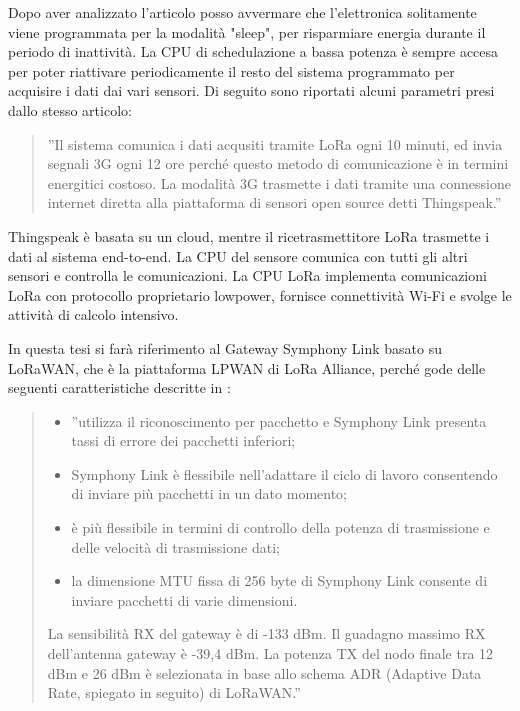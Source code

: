 \documentclass[a4paper]{report} %
\begin{document}
Dopo aver analizzato l'articolo \cite{art:rif.43} posso avvermare che l'elettronica solitamente viene programmata per la modalità "sleep", per risparmiare energia durante il periodo di inattività. La CPU di schedulazione a bassa potenza è sempre accesa per poter riattivare periodicamente il resto del sistema programmato per acquisire i dati dai vari sensori. Di seguito sono riportati alcuni parametri presi dallo stesso articolo:
\begin{quote}
	''Il sistema comunica i dati acqusiti tramite LoRa ogni 10 minuti, ed invia segnali 3G ogni 12 ore perché questo metodo di comunicazione è in termini energitici costoso. La modalità 3G trasmette i dati tramite una connessione internet diretta alla piattaforma di sensori open source detti Thingspeak.'' 
\end{quote}
Thingspeak è basata su un cloud, mentre il ricetrasmettitore LoRa trasmette i dati al sistema end-to-end. La CPU del sensore comunica con tutti gli altri sensori e controlla le comunicazioni. La CPU LoRa implementa comunicazioni LoRa con protocollo proprietario lowpower, fornisce connettività Wi-Fi e svolge le attività di calcolo intensivo. 

In questa tesi si farà riferimento al Gateway Symphony Link basato su LoRaWAN, che è la piattaforma LPWAN di LoRa Alliance, perché gode delle seguenti caratteristiche descritte in \cite{art:rif.47}:
\begin{quote}
	\begin{itemize}
		\item ''utilizza il riconoscimento per pacchetto e Symphony Link presenta tassi di errore dei pacchetti inferiori;
		\item Symphony Link è flessibile nell'adattare il ciclo di lavoro consentendo di inviare più pacchetti in un dato momento;
		\item è più flessibile in termini di controllo della potenza di trasmissione e delle velocità di trasmissione dati;
		\item la dimensione MTU fissa di 256 byte di Symphony Link consente di inviare pacchetti di varie dimensioni.
	\end{itemize}
	La sensibilità RX del gateway è di -133 dBm. Il guadagno massimo RX dell'antenna gateway è -39,4 dBm. La potenza TX del nodo finale tra 12 dBm e 26 dBm è selezionata in base allo schema ADR (Adaptive Data Rate, spiegato in seguito) di LoRaWAN.'' 
\end{quote}
\end{document}
